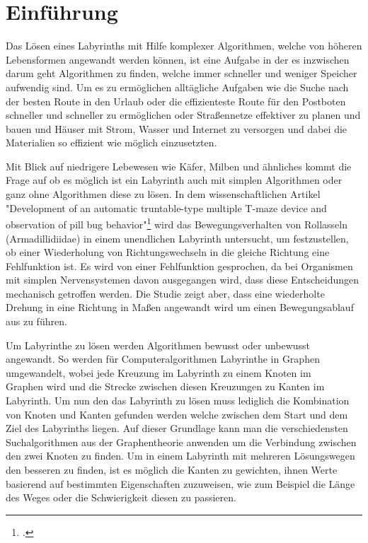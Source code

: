 \documentclass[12pt, a4paper, titlepage]{article}
\begin{document}

\tableofcontents

\newpage

\section{Einführung}

Das Lösen eines Labyrinths mit Hilfe komplexer Algorithmen, welche von höheren Lebensformen angewandt werden können, ist eine Aufgabe in der es inzwischen darum geht Algorithmen zu finden, welche immer schneller und weniger Speicher aufwendig sind.
Um es zu ermöglichen alltägliche Aufgaben wie die Suche nach der besten Route in den Urlaub oder die effizienteste Route für den Postboten schneller und schneller zu ermöglichen oder Straßennetze effektiver zu planen und bauen und Häuser mit Strom, Wasser und Internet zu versorgen und dabei die Materialien so effizient wie möglich einzusetzten.


\bigskip

Mit Blick auf niedrigere Lebewesen wie Käfer, Milben und ähnliches kommt die Frage auf ob es möglich ist ein Labyrinth auch mit simplen Algorithmen oder ganz ohne Algorithmen diese zu lösen.
In dem wissenschaftlichen Artikel "Development of an automatic truntable-type multiple T-maze device and observation of pill bug behavior"\footcite{bug} wird das Bewegungsverhalten von Rollasseln (Armadillidiidae) in einem unendlichen Labyrinth untersucht, um festzustellen, ob einer Wiederholung von Richtungswechseln in die gleiche Richtung eine Fehlfunktion ist.
Es wird von einer Fehlfunktion gesprochen, da bei Organismen mit simplen Nervensystemen davon ausgegangen wird, dass diese Entscheidungen mechanisch getroffen werden.
Die Studie zeigt aber, dass eine wiederholte Drehung in eine Richtung in Maßen angewandt wird um einen Bewegungsablauf aus zu führen.

\bigskip

Um Labyrinthe zu lösen werden Algorithmen bewusst oder unbewusst angewandt.
So werden für Computeralgorithmen Labyrinthe in Graphen umgewandelt, wobei jede Kreuzung im Labyrinth zu einem Knoten im \\ Graphen wird und die Strecke zwischen diesen Kreuzungen zu Kanten im Labyrinth.
Um nun den das Labyrinth zu lösen muss lediglich die Kombination von Knoten und Kanten gefunden werden welche zwischen dem Start und dem Ziel des Labyrinths liegen.
Auf dieser Grundlage kann man die verschiedensten Suchalgorithmen aus der Graphentheorie anwenden um die Verbindung zwischen den zwei Knoten zu finden.
Um in einem Labyrinth mit mehreren Lösungswegen den besseren zu finden, ist es möglich die Kanten zu gewichten, ihnen Werte basierend auf bestimmten Eigenschaften zuzuweisen, wie zum Beispiel die Länge des Weges oder die Schwierigkeit diesen zu passieren.
\end{document}
